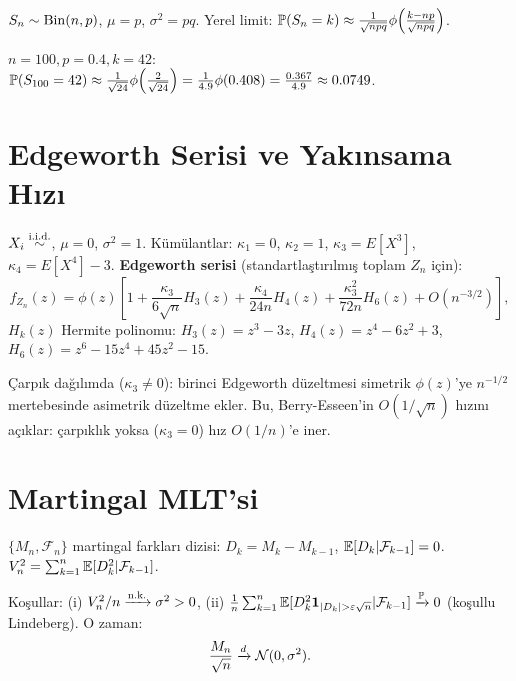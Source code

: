 \begin{ornek}\label{ex:binom_yerel}
$S_n\sim\operatorname{Bin}(n,p)$, $\mu=p$, $\sigma^2=pq$. Yerel limit: $\mathbb{P}(S_n=k)\approx\frac{1}{\sqrt{npq}}\phi\!\left(\frac{k-np}{\sqrt{npq}}\right)$.

$n=100,p=0.4,k=42$: $\mathbb{P}(S_{100}=42)\approx\frac{1}{\sqrt{24}}\phi\!\left(\frac{2}{\sqrt{24}}\right)=\frac{1}{4.9}\phi(0.408)=\frac{0.367}{4.9}\approx0.0749$.
\end{ornek}

\section{Edgeworth Serisi ve Yakınsama Hızı}
\label{sec:edgeworth}

\begin{tanim}\label{def:edgeworth}
$X_i\overset{\text{i.i.d.}}{\sim}$, $\mu=0$, $\sigma^2=1$. Kümülantlar: $\kappa_1=0$, $\kappa_2=1$, $\kappa_3=E[X^3]$, $\kappa_4=E[X^4]-3$. \textbf{Edgeworth serisi} (standartlaştırılmış toplam $Z_n$ için):
\[
  f_{Z_n}(z) = \phi(z)\left[1 + \frac{\kappa_3}{6\sqrt{n}}H_3(z) + \frac{\kappa_4}{24n}H_4(z) + \frac{\kappa_3^2}{72n}H_6(z) + O(n^{-3/2})\right],
\]
$H_k(z)$ Hermite polinomu: $H_3(z)=z^3-3z$, $H_4(z)=z^4-6z^2+3$, $H_6(z)=z^6-15z^4+45z^2-15$.
\end{tanim}

\begin{ornek}\label{ex:edgeworth_carpiklik}
Çarpık dağılımda ($\kappa_3\neq0$): birinci Edgeworth düzeltmesi simetrik $\phi(z)$'ye $n^{-1/2}$ mertebesinde asimetrik düzeltme ekler. Bu, Berry-Esseen'in $O(1/\sqrt{n})$ hızını açıklar: çarpıklık yoksa ($\kappa_3=0$) hız $O(1/n)$'e iner.
\end{ornek}

\section{Martingal MLT'si}
\label{sec:martingal_mlt}

\begin{teorem}\label{thm:mart_mlt}
$\{M_n,\mathcal{F}_n\}$ martingal farkları dizisi: $D_k=M_k-M_{k-1}$, $\mathbb{E}[D_k|\mathcal{F}_{k-1}]=0$. $V_n^2=\sum_{k=1}^n\mathbb{E}[D_k^2|\mathcal{F}_{k-1}]$.

Koşullar: (i) $V_n^2/n\xrightarrow{\text{n.k.}}\sigma^2>0$, (ii) $\frac{1}{n}\sum_{k=1}^n\Beklenti[D_k^2\mathbf{1}_{|D_k|>\varepsilon\sqrt{n}}|\mathcal{F}_{k-1}]\pto0$ (koşullu Lindeberg). O zaman:
\[
  \frac{M_n}{\sqrt{n}}\xrightarrow{d}\mathcal{N}(0,\sigma^2).
\]
\end{teorem}

